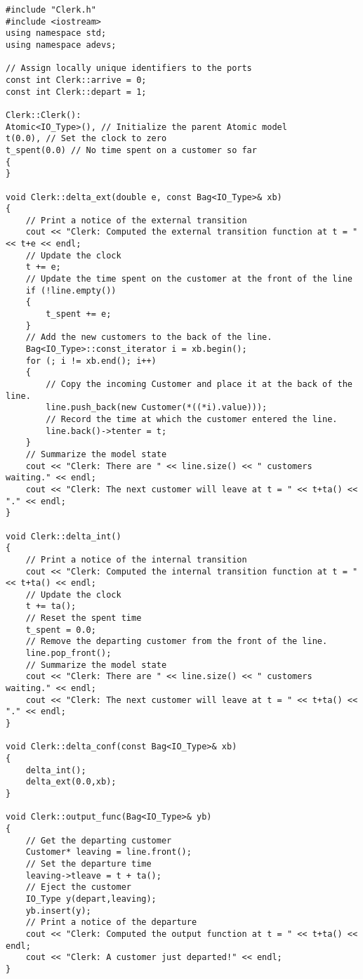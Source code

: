\begin{verbatim}
#include "Clerk.h"
#include <iostream>
using namespace std;
using namespace adevs;

// Assign locally unique identifiers to the ports
const int Clerk::arrive = 0;
const int Clerk::depart = 1;

Clerk::Clerk():
Atomic<IO_Type>(), // Initialize the parent Atomic model
t(0.0), // Set the clock to zero
t_spent(0.0) // No time spent on a customer so far
{
}

void Clerk::delta_ext(double e, const Bag<IO_Type>& xb)
{
    // Print a notice of the external transition
    cout << "Clerk: Computed the external transition function at t = " << t+e << endl;
    // Update the clock
    t += e;
    // Update the time spent on the customer at the front of the line
    if (!line.empty())
    {
        t_spent += e;
    }
    // Add the new customers to the back of the line.
    Bag<IO_Type>::const_iterator i = xb.begin();
    for (; i != xb.end(); i++)
    {
        // Copy the incoming Customer and place it at the back of the line.
        line.push_back(new Customer(*((*i).value)));
        // Record the time at which the customer entered the line.
        line.back()->tenter = t;
    }
    // Summarize the model state
    cout << "Clerk: There are " << line.size() << " customers waiting." << endl;
    cout << "Clerk: The next customer will leave at t = " << t+ta() << "." << endl;
}
    
void Clerk::delta_int()
{
    // Print a notice of the internal transition
    cout << "Clerk: Computed the internal transition function at t = " << t+ta() << endl;
    // Update the clock
    t += ta();
    // Reset the spent time 
    t_spent = 0.0;
    // Remove the departing customer from the front of the line.
    line.pop_front();
    // Summarize the model state
    cout << "Clerk: There are " << line.size() << " customers waiting." << endl;
    cout << "Clerk: The next customer will leave at t = " << t+ta() << "." << endl;
}

void Clerk::delta_conf(const Bag<IO_Type>& xb)
{
    delta_int();
    delta_ext(0.0,xb);
}

void Clerk::output_func(Bag<IO_Type>& yb)
{
    // Get the departing customer
    Customer* leaving = line.front();
    // Set the departure time
    leaving->tleave = t + ta();
    // Eject the customer 
    IO_Type y(depart,leaving);
    yb.insert(y);
    // Print a notice of the departure
    cout << "Clerk: Computed the output function at t = " << t+ta() << endl;
    cout << "Clerk: A customer just departed!" << endl;
}


\end{verbatim}
